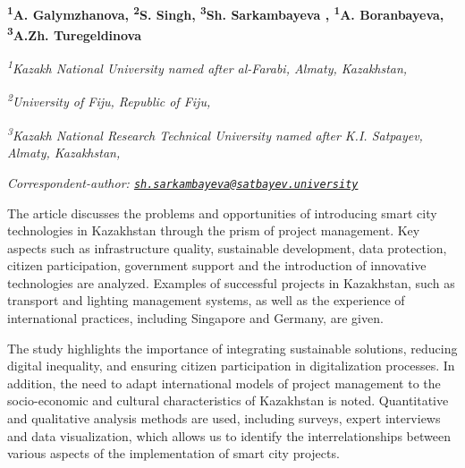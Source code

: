 
\begin{articleheader}

{\bfseries
\textsuperscript{1}A. Galymzhanova\authorid,
\textsuperscript{2}S. Singh\authorid,
\textsuperscript{3}Sh. Sarkambayeva\textsuperscript{\envelope } \authorid,
\textsuperscript{1}A. Boranbayeva\authorid,
\textsuperscript{3}A.Zh. Turegeldinova\authorid}
\end{articleheader}

\begin{affiliation}
\emph{\textsuperscript{1}Kazakh National University named after al-Farabi, Almaty, Kazakhstan,}

\emph{\textsuperscript{2}University of Fiju, Republic of Fiju,}

\emph{\textsuperscript{3}Kazakh National Research Technical University named after K.I. Satpayev, Almaty, Kazakhstan,}

\raggedright \textsuperscript{\envelope }{\em Correspondent-author: \href{mailto:sh.sarkambayeva@satbayev.university}{\nolinkurl{sh.sarkambayeva@satbayev.university}}}
\end{affiliation}

The article discusses the problems and opportunities of introducing
smart city technologies in Kazakhstan through the prism of project
management. Key aspects such as infrastructure quality, sustainable
development, data protection, citizen participation, government support
and the introduction of innovative technologies are analyzed. Examples
of successful projects in Kazakhstan, such as transport and lighting
management systems, as well as the experience of international
practices, including Singapore and Germany, are given.

The study highlights the importance of integrating sustainable
solutions, reducing digital inequality, and ensuring citizen
participation in digitalization processes. In addition, the need to
adapt international models of project management to the socio-economic
and cultural characteristics of Kazakhstan is noted. Quantitative and
qualitative analysis methods are used, including surveys, expert
interviews and data visualization, which allows us to identify the
interrelationships between various aspects of the implementation of
smart city projects.

